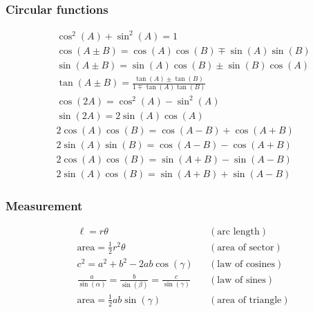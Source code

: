 \clearpage

\fillwithgrid{3.5in}

\threeast

\begin{multicols}{2}
\setlength\columnsep{1ex}
\footnotesize
\mathleft

\subsubsection*{Circular functions}
\label{sec:circular-functions}

\begin{align*}
    &\cos^2(A) + \sin^2(A) = 1 \\
    &\cos(A \pm B) = \cos(A)\cos(B) \mp \sin(A)\sin(B) \\
    &\sin(A \pm B) = \sin(A)\cos(B) \pm \sin(B)\cos(A) \\
    &\tan(A \pm B) = \tfrac{\tan(A) \pm \tan(B)}{1 \mp \tan(A)\tan(B)} \\
    &\cos(2A) = \cos^2(A) - \sin^2(A) \\
    &\sin(2A) = 2\sin(A)\cos(A) \\
    &2\cos(A)\cos(B) = \cos(A - B) + \cos(A + B) \\
    &2\sin(A)\sin(B) = \cos(A - B) - \cos(A + B) \\
    &2\cos(A)\cos(B) = \sin(A + B) - \sin(A - B) \\
    &2\sin(A)\cos(B) = \sin(A + B) + \sin(A - B)
\end{align*}

\subsubsection*{Measurement}
\label{sec:measurement}

\begin{align*}
    &\ell = r\theta && (\textrm{arc length}) \\
    &\textrm{area} = \tfrac{1}{2} r^2\theta && (\textrm{area of sector}) \\
    &c^2 = a^2 + b^2 - 2ab\cos(\gamma) && (\textrm{law of cosines}) \\
    &\tfrac{a}{\sin(\alpha)} = \tfrac{b}{\sin(\beta)} = \tfrac{c}{\sin(\gamma)} && (\textrm{law of sines}) \\
    &\textrm{area} = \tfrac{1}{2}ab\sin(\gamma) && (\textrm{area of triangle})
\end{align*}
\begin{center}
\end{center}


\end{multicols}
